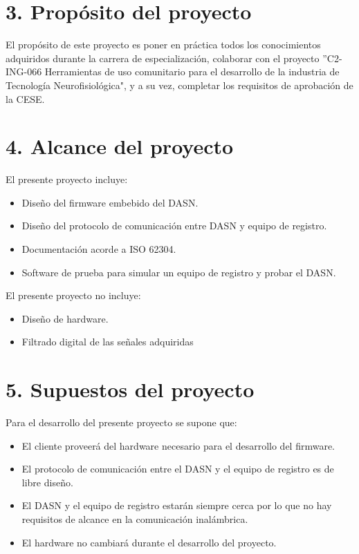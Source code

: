 \documentclass[
11pt, %
codirector, %
]{charter}
\begin{document}
\section{3. Propósito del proyecto}
\label{sec:proposito}

El propósito de este proyecto es poner en práctica todos los conocimientos adquiridos durante la carrera de especialización, colaborar con el proyecto ''C2-ING-066 Herramientas de uso comunitario para el desarrollo de la industria de Tecnología Neurofisiológica", y a su vez, completar los requisitos de aprobación de la CESE.

\section{4. Alcance del proyecto}
\label{sec:alcance}

El presente proyecto incluye:
\begin{itemize}
	\item Diseño del firmware embebido del DASN.
	\item Diseño del protocolo de comunicación entre DASN y equipo de registro.
	\item Documentación acorde a ISO 62304.
	\item Software de prueba para simular un equipo de registro y probar el DASN.
\end{itemize}

El presente proyecto no incluye:
\begin{itemize}
	\item Diseño de hardware.
	\item Filtrado digital de las señales adquiridas
\end{itemize}


\section{5. Supuestos del proyecto}
\label{sec:supuestos}

Para el desarrollo del presente proyecto se supone que:
\begin{itemize}
	\item El cliente proveerá del hardware necesario para el desarrollo del firmware.
	\item El protocolo de comunicación entre el DASN y el equipo de registro es de libre diseño.
	\item El DASN y el equipo de registro estarán siempre cerca por lo que no hay requisitos de alcance en la comunicación inalámbrica.
	\item El hardware no cambiará durante el desarrollo del proyecto.
\end{itemize}
\end{document}
